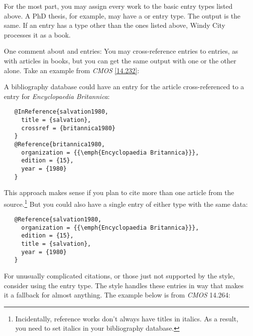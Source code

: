 \documentclass[11pt,letterpaper,oneside]{article}
\begin{document}
\noindent For the most part, you may assign every work to the basic
entry types listed above. A PhD thesis, for example, may have a
 or  entry type. The output is the
same. If an entry has a type other than the ones listed above, Windy
City processes it as a book.

One comment about  and 
entries: You may cross-reference  entries to
 entries, as with articles in books, but you can
get the same output with one or the other alone. Take an example from
\textit{CMOS} \ref{14.232}:

\begin{citeonly}
\item \cite{salvation1980}
\end{citeonly}

A bibliography database could have an  entry for
the article cross-ref\-er\-enc\-ed to a  entry for
\textit{Encyclopaedia Britannica}:

\begin{verbatim}
   @InReference{salvation1980,
     title = {salvation},
     crossref = {britannica1980}
   }
   @Reference{britannica1980,
     organization = {{\emph{Encyclopaedia Britannica}}},
     edition = {15},
     year = {1980}
   }
\end{verbatim}

\noindent This approach makes sense if you plan to cite more than one
article from the source.\footnote{Incidentally, reference works don't
always have titles in italics. As a result, you need to set italics in
your bibliography database.} But you could also have a single entry of
either type with the same data:

\begin{verbatim}
   @Reference{salvation1980,
     organization = {{\emph{Encyclopaedia Britannica}}},
     edition = {15},
     title = {salvation},
     year = {1980}
   }
\end{verbatim}

For unusually complicated citations, or those just not supported by
the style, consider using the  entry type. The style
handles these entries in way that makes it a fallback for almost
anything. The example below is from \textit{CMOS} 14.264:

\begin{citebib}
\item \cite{roosevelt1959}
\end{citebib}
\end{document}
